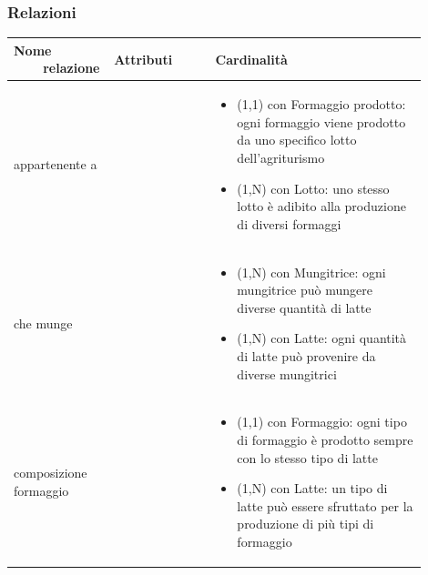 \documentclass[12pt,a4paper]{article}
\begin{document}
\subsubsection{Relazioni}
\label{Produzione Relazioni}
\begin{center}

\setlength{\extrarowheight}{1.5pt}

\begin{longtable}{|p{0.16\linewidth}|p{0.24\linewidth}|p{0.50\linewidth}|}
\hline 
\textbf{Nome \ \ \ \ relazione} 	& \textbf{Attributi} & \textbf{Cardinalità}\\ 

    
\hline
appartenente a 				&   
					& \begin{itemize}
						\setlength{\itemindent}{-1em}
						\vspace{-15pt}
						\setlength\itemsep{-0.25em}
						\item (1,1) con Formaggio prodotto: ogni formaggio viene prodotto da uno specifico lotto dell'agriturismo
						\item (1,N) con Lotto: uno stesso lotto è adibito alla produzione di diversi formaggi
					\end{itemize}\\ 

\hline
che munge 				&   
					& \begin{itemize}
						\setlength{\itemindent}{-1em}
						\vspace{-25pt}
						\setlength\itemsep{-0.25em}
						\item (1,N) con Mungitrice: ogni mungitrice può mungere diverse quantità di latte
						\item (1,N) con Latte: ogni quantità di latte può provenire da diverse mungitrici
					\end{itemize}\\ 

\hline
composizione formaggio 				&   
					& \begin{itemize}
						\setlength{\itemindent}{-1em}
						\vspace{-25pt}
						\setlength\itemsep{-0.25em}
						\item (1,1) con Formaggio: ogni tipo di formaggio è prodotto sempre con lo stesso tipo di latte
						\item (1,N) con Latte: un tipo di latte può essere sfruttato per la produzione di più tipi di formaggio
					\end{itemize}\\ 


\end{longtable}
\end{center}
\end{document}
